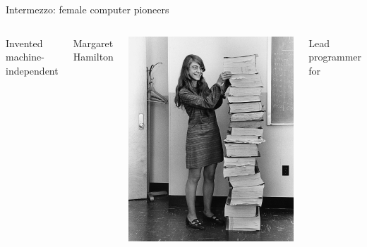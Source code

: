 \documentclass[aspectratio=169,usenames,dvipsnames]{beamer}
\begin{document}
\begin{frame}{Intermezzo: female computer pioneers}
\begin{columns}
		Invented machine-independent 

		\pause
		Margaret Hamilton %

		\vspace{1ex}
		\includegraphics[width=0.9\linewidth]{fig/margarethamilton}

		Lead programmer for 
	\end{columns}
\end{frame}

\end{document}
